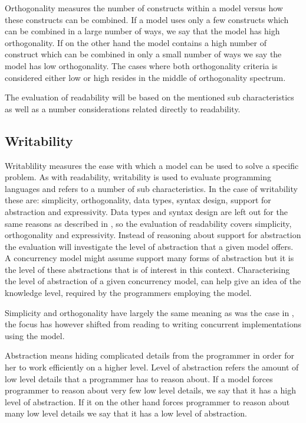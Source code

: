 Orthogonality measures the number of constructs within a model versus how these constructs can be combined\cite[p. 9]{sebestaProLang}. If a model uses only a few constructs which can be combined in a large number of ways, we say that the model has high orthogonality. If on the other hand the model contains a high number of construct which can be combined in only a small number of ways we say the model has low orthogonality. The cases where both orthogonality criteria is considered either low or high resides in the middle of orthogonality spectrum.

The evaluation of readability will be based on the mentioned sub characteristics as well as a number considerations related directly to readability.

\subsection{Writability}\label{sec:writablity}
Writablility measures the ease with which a model can be used to solve a specific problem\cite[p. 13]{sebestaProLang}. As with readability, writability is used to evaluate programming languages and refers to a number of sub characteristics. In the case of writability these are: simplicity, orthogonality, data types, syntax design, support for abstraction and expressivity. Data types and syntax design are left out for the same reasons as described in , so the evaluation of readability covers simplicity, orthogonality and expressivity. Instead of reasoning about support for abstraction the evaluation will investigate the level of abstraction that a given model offers. A concurrency model might assume support many forms of abstraction but it is the level of these abstractions that is of interest in this context. Characterising the level of abstraction of a given concurrency model, can help give an idea of the knowledge level, required by the programmers employing the model.

Simplicity and orthogonality have largely the same meaning as was the case in , the focus has however shifted from reading to writing concurrent implementations using the model. 

Abstraction means hiding complicated details from the programmer in order for her to work efficiently on a higher level\cite[p. 14]{sebestaProLang}. Level of abstraction refers the amount of low level details that a programmer has to reason about. If a model forces programmer to reason about very few low level details, we say that it has a high level of abstraction. If it on the other hand forces programmer to reason about many low level details we say that it has a low level of abstraction.

